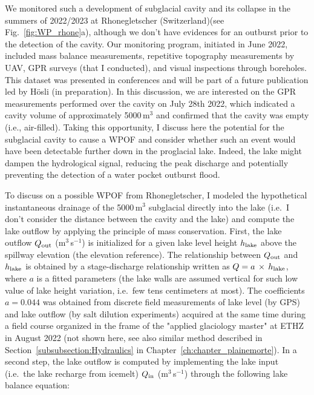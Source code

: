 We monitored such a development of subglacial cavity and its collapse in the summers of 2022/2023 at Rhonegletscher (Switzerland)(see Fig.~\ref{fig:WP_rhone}a), although we don't have evidences for an outburst prior to the detection of the cavity. Our monitoring program, initiated in June 2022, included mass balance measurements, repetitive topography measurements by UAV, GPR surveys (that I conducted), and visual inspections through boreholes. This dataset was presented in conferences \citep{Ogier&al2022,Hosli&al2022,Bauder&al2023} and  will be part of a future publication led by Hösli (in preparation). In this discussion, we are interested on the GPR measurements performed over the cavity on July 28th 2022, which indicated a cavity volume of approximately 5000\,m$^3$ and confirmed that the cavity was empty (i.e., air-filled). Taking this opportunity, I discuss here the potential for the subglacial cavity to cause a WPOF and consider whether such an event would have been detectable further down in the proglacial lake. Indeed, the lake might dampen the hydrological signal, reducing the peak discharge and potentially preventing the detection of a water pocket outburst flood. 

To discuss on a possible WPOF from Rhonegletscher, I modeled the hypothetical instantaneous drainage of the 5000\,m$^3$ subglacial directly into the lake (i.e.\ I don't consider the distance between the cavity and the lake) and compute the lake outflow by applying the principle of mass conservation. First, the lake outflow $Q_{\rm out}$ (m$^3$\,s$^{-1}$) is initialized for a given lake level height $h_{\rm lake}$ above the spillway elevation (the elevation reference). The relationship between $Q_{\rm out}$ and $h_{\rm lake}$ is obtained by a stage-discharge relationship written as $Q = a\,\times\,h_{\rm lake}$, where $a$ is a fitted parameters (the lake walls are assumed vertical for such low value of lake height variation, i.e.\ few tens centimeters at most). The coefficients $a = 0.044$ was obtained from discrete field measurements of lake level (by GPS) and lake outflow (by salt dilution experiments) acquired at the same time during a field course organized in the frame of the "applied glaciology master" at ETHZ in August 2022 (not shown here, see also similar method described in Section~\ref{subsubsection:Hydraulics} in Chapter~\ref{ch:chapter_plainemorte}). In a second step, the lake outflow is computed by implementing the lake input (i.e.\ the lake recharge from icemelt) $Q_{\rm in}$ (m$^3$\,s$^{-1}$) through the following lake balance equation:


